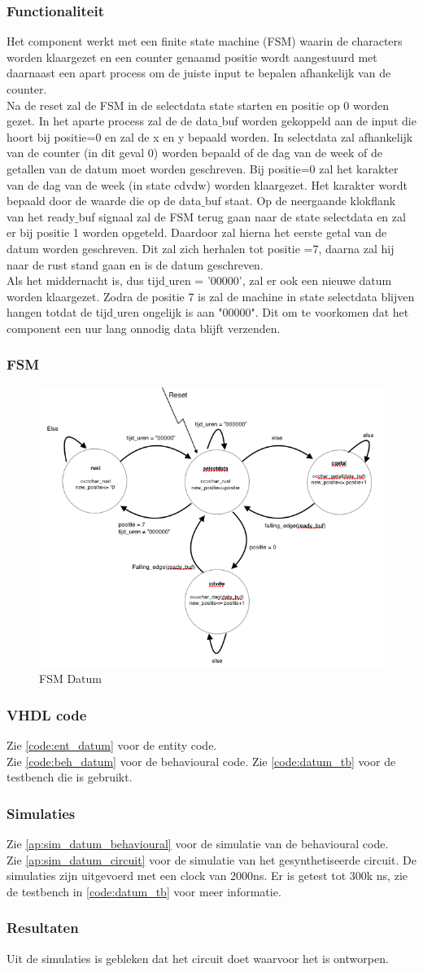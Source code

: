 \subsubsection{Functionaliteit}
Het component werkt met een finite state machine (FSM) waarin de characters worden klaargezet en een counter genaamd positie wordt aangestuurd met daarnaast een apart process om de juiste input te bepalen afhankelijk van de counter. \\
Na de reset zal de FSM in de selectdata state starten en positie op 0 worden gezet. 
In het aparte process zal de de data$\_$buf worden gekoppeld aan de input die hoort bij positie=0 en zal de x en y bepaald worden. 
 In selectdata zal  afhankelijk van de counter (in dit geval 0) worden bepaald of de dag van de week of de getallen van de datum moet worden geschreven. Bij positie=0 zal het karakter van de dag van de week (in state cdvdw) worden klaargezet. Het karakter wordt bepaald door de waarde die op de data$\_$buf staat. Op de neergaande klokflank van het ready$\_$buf signaal zal de FSM terug gaan naar de state selectdata en zal er bij positie 1 worden opgeteld. Daardoor zal hierna het eerste getal van de datum worden geschreven. Dit zal zich herhalen tot positie =7, daarna zal hij naar de rust stand gaan en is de datum geschreven. \\
 Als het middernacht is, dus tijd$\_$uren = '00000', zal er ook een nieuwe datum worden klaargezet. Zodra de positie 7 is zal de machine in state selectdata blijven hangen totdat de tijd$\_$uren ongelijk is aan "00000". Dit om te voorkomen dat het component een uur lang onnodig data blijft verzenden. 


\subsubsection{FSM}
\begin{figure}
  \centering
     \includegraphics[angle = 0, scale= 0.6]{verslag_schemas/datum_fsm.png}
       \caption{FSM Datum}
\label{fig:simlayout}
\end{figure}

\subsubsection{VHDL code}
Zie \ref{code:ent_datum} voor de entity code. \\
Zie \ref{code:beh_datum} voor de behavioural code.
Zie \ref{code:datum_tb} voor de testbench die is gebruikt.
\subsubsection{Simulaties}
Zie \ref{ap:sim_datum_behavioural} voor de simulatie van de behavioural code. \\
Zie \ref{ap:sim_datum_circuit} voor de simulatie van het gesynthetiseerde circuit. 
De simulaties zijn uitgevoerd met een clock van 2000ns.  Er is getest tot 300k ns, zie de testbench in \ref{code:datum_tb} voor meer informatie.

\subsubsection{Resultaten}
Uit de simulaties is gebleken dat het circuit doet waarvoor het is ontworpen.
